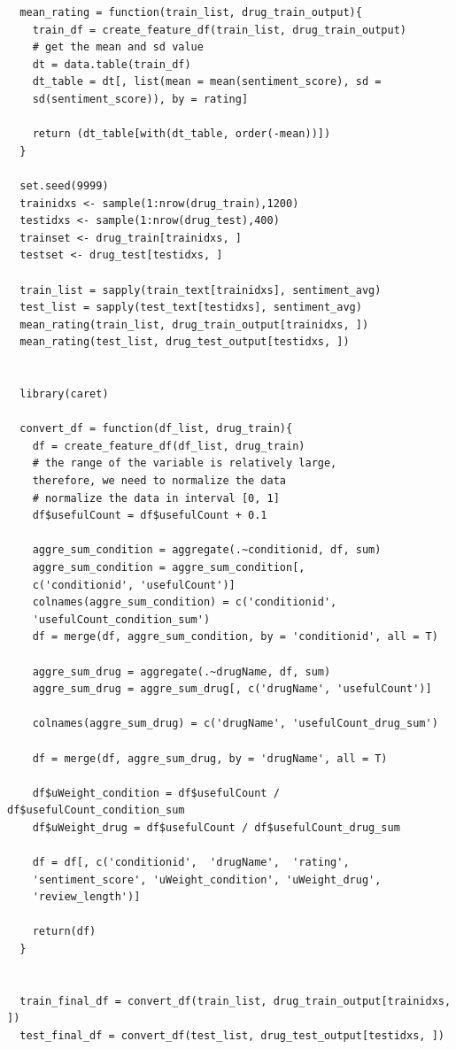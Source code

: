 \documentclass{article}
\begin{document}
\begin{verbatim}
  mean_rating = function(train_list, drug_train_output){
    train_df = create_feature_df(train_list, drug_train_output)
    # get the mean and sd value
    dt = data.table(train_df)
    dt_table = dt[, list(mean = mean(sentiment_score), sd = 
    sd(sentiment_score)), by = rating]
    
    return (dt_table[with(dt_table, order(-mean))])
  }

  set.seed(9999)
  trainidxs <- sample(1:nrow(drug_train),1200)
  testidxs <- sample(1:nrow(drug_test),400)
  trainset <- drug_train[trainidxs, ]
  testset <- drug_test[testidxs, ]

  train_list = sapply(train_text[trainidxs], sentiment_avg)
  test_list = sapply(test_text[testidxs], sentiment_avg)
  mean_rating(train_list, drug_train_output[trainidxs, ])
  mean_rating(test_list, drug_test_output[testidxs, ])


  library(caret)

  convert_df = function(df_list, drug_train){
    df = create_feature_df(df_list, drug_train)
    # the range of the variable is relatively large, 
    therefore, we need to normalize the data
    # normalize the data in interval [0, 1]
    df$usefulCount = df$usefulCount + 0.1
    
    aggre_sum_condition = aggregate(.~conditionid, df, sum)
    aggre_sum_condition = aggre_sum_condition[, 
    c('conditionid', 'usefulCount')]
    colnames(aggre_sum_condition) = c('conditionid', 
    'usefulCount_condition_sum')
    df = merge(df, aggre_sum_condition, by = 'conditionid', all = T)
    
    aggre_sum_drug = aggregate(.~drugName, df, sum)
    aggre_sum_drug = aggre_sum_drug[, c('drugName', 'usefulCount')]
    
    colnames(aggre_sum_drug) = c('drugName', 'usefulCount_drug_sum')
    
    df = merge(df, aggre_sum_drug, by = 'drugName', all = T)
    
    df$uWeight_condition = df$usefulCount / df$usefulCount_condition_sum
    df$uWeight_drug = df$usefulCount / df$usefulCount_drug_sum
    
    df = df[, c('conditionid',  'drugName',  'rating',  
    'sentiment_score', 'uWeight_condition', 'uWeight_drug', 
    'review_length')]
    
    return(df)
  }


  train_final_df = convert_df(train_list, drug_train_output[trainidxs, ])
  test_final_df = convert_df(test_list, drug_test_output[testidxs, ])



\end{verbatim}
\end{document}
